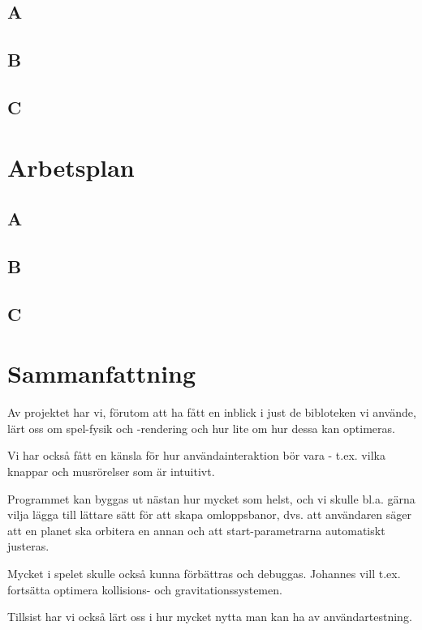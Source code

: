 \documentclass[a4paper, 11pt]{article}
\begin{document}
\subsection{A}


\subsection{B}


\subsection{C}


\section{Arbetsplan}
\label{sec:arbplan}

\subsection{A}


\subsection{B}


\subsection{C}


\section{Sammanfattning}

Av projektet har vi, förutom att ha fått en inblick i just de
bibloteken vi använde, lärt oss om spel-fysik och -rendering
och hur lite om hur dessa kan optimeras.

Vi har också fått en känsla för hur användainteraktion bör
vara - t.ex. vilka knappar och musrörelser som är intuitivt.

Programmet kan byggas ut nästan hur mycket som helst,
och vi skulle bl.a. gärna vilja lägga till lättare sätt
för att skapa omloppsbanor, dvs. att användaren säger att
en planet ska orbitera en annan och att start-parametrarna
automatiskt justeras.

Mycket i spelet skulle också kunna förbättras och debuggas.
Johannes vill t.ex. fortsätta optimera kollisions- och gravitationssystemen.

Tillsist har vi också lärt oss i hur mycket nytta man
kan ha av användartestning.
\end{document}
